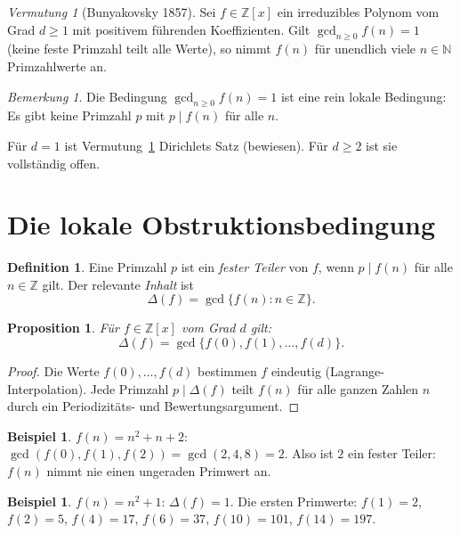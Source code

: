 \documentclass[12pt,a4paper]{amsart}
\newtheorem{proposition}[theorem]{Proposition}
\theoremstyle{definition}
\newtheorem{definition_de}[theorem]{Definition}
\newtheorem{example}[theorem]{Beispiel}
\theoremstyle{remark}
\newtheorem{bemerkung}[theorem]{Bemerkung}
\newtheorem{vermutung}[theorem]{Vermutung}
\newcommand{\N}{\mathbb{N}}
\newcommand{\Z}{\mathbb{Z}}
\begin{document}
\begin{vermutung}[Bunyakovsky 1857]
\label{verm:buny}
Sei $f \in \Z[x]$ ein irreduzibles Polynom vom Grad $d \geq 1$ mit
positivem führenden Koeffizienten.
Gilt $\gcd_{n \geq 0} f(n) = 1$ (keine feste Primzahl teilt alle Werte),
so nimmt $f(n)$ für unendlich viele $n \in \N$ Primzahlwerte an.
\end{vermutung}

\begin{bemerkung}
Die Bedingung $\gcd_{n \geq 0} f(n) = 1$ ist eine rein lokale Bedingung:
Es gibt keine Primzahl $p$ mit $p \mid f(n)$ für alle $n$.
\end{bemerkung}

Für $d = 1$ ist Vermutung~\ref{verm:buny} Dirichlets Satz (bewiesen).
Für $d \geq 2$ ist sie vollständig offen.

\section{Die lokale Obstruktionsbedingung}

\begin{definition_de}
Eine Primzahl $p$ ist ein \emph{fester Teiler} von $f$, wenn $p \mid f(n)$
für alle $n \in \Z$ gilt.
Der relevante \emph{Inhalt} ist
\[
  \Delta(f) = \gcd\{f(n) : n \in \Z\}.
\]
\end{definition_de}

\begin{proposition}
\label{prop:lokal}
Für $f \in \Z[x]$ vom Grad $d$ gilt:
\[
  \Delta(f) = \gcd\{f(0), f(1), \ldots, f(d)\}.
\]
\end{proposition}

\begin{proof}
Die Werte $f(0), \ldots, f(d)$ bestimmen $f$ eindeutig (Lagrange-Interpolation).
Jede Primzahl $p \mid \Delta(f)$ teilt $f(n)$ für alle ganzen Zahlen $n$
durch ein Periodizitäts- und Bewertungsargument.
\end{proof}

\begin{example}
$f(n) = n^2 + n + 2$: $\gcd(f(0), f(1), f(2)) = \gcd(2, 4, 8) = 2$.
Also ist $2$ ein fester Teiler: $f(n)$ nimmt nie einen ungeraden Primwert an.
\end{example}

\begin{example}
$f(n) = n^2 + 1$: $\Delta(f) = 1$.
Die ersten Primwerte: $f(1)=2$, $f(2)=5$, $f(4)=17$, $f(6)=37$, $f(10)=101$,
$f(14)=197$.
\end{example}
\end{document}

